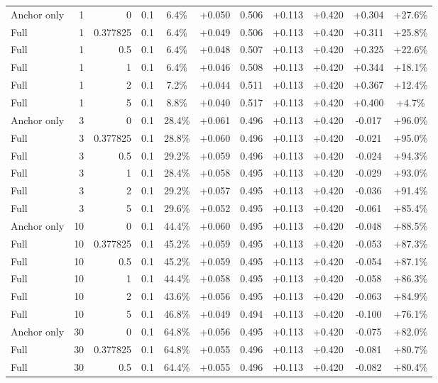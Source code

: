 \begin{table}[htbp]
\begin{tabular}{lrrrccccccc}
Anchor only & 1 & 0 & 0.1 & 6.4\% & +0.050 & 0.506 & +0.113 & +0.420 & +0.304 & +27.6\% \\
Full & 1 & 0.377825 & 0.1 & 6.4\% & +0.049 & 0.506 & +0.113 & +0.420 & +0.311 & +25.8\% \\
Full & 1 & 0.5 & 0.1 & 6.4\% & +0.048 & 0.507 & +0.113 & +0.420 & +0.325 & +22.6\% \\
Full & 1 & 1 & 0.1 & 6.4\% & +0.046 & 0.508 & +0.113 & +0.420 & +0.344 & +18.1\% \\
Full & 1 & 2 & 0.1 & 7.2\% & +0.044 & 0.511 & +0.113 & +0.420 & +0.367 & +12.4\% \\
Full & 1 & 5 & 0.1 & 8.8\% & +0.040 & 0.517 & +0.113 & +0.420 & +0.400 & +4.7\% \\
Anchor only & 3 & 0 & 0.1 & 28.4\% & +0.061 & 0.496 & +0.113 & +0.420 & -0.017 & +96.0\% \\
Full & 3 & 0.377825 & 0.1 & 28.8\% & +0.060 & 0.496 & +0.113 & +0.420 & -0.021 & +95.0\% \\
Full & 3 & 0.5 & 0.1 & 29.2\% & +0.059 & 0.496 & +0.113 & +0.420 & -0.024 & +94.3\% \\
Full & 3 & 1 & 0.1 & 28.4\% & +0.058 & 0.495 & +0.113 & +0.420 & -0.029 & +93.0\% \\
Full & 3 & 2 & 0.1 & 29.2\% & +0.057 & 0.495 & +0.113 & +0.420 & -0.036 & +91.4\% \\
Full & 3 & 5 & 0.1 & 29.6\% & +0.052 & 0.495 & +0.113 & +0.420 & -0.061 & +85.4\% \\
Anchor only & 10 & 0 & 0.1 & 44.4\% & +0.060 & 0.495 & +0.113 & +0.420 & -0.048 & +88.5\% \\
Full & 10 & 0.377825 & 0.1 & 45.2\% & +0.059 & 0.495 & +0.113 & +0.420 & -0.053 & +87.3\% \\
Full & 10 & 0.5 & 0.1 & 45.2\% & +0.059 & 0.495 & +0.113 & +0.420 & -0.054 & +87.1\% \\
Full & 10 & 1 & 0.1 & 44.4\% & +0.058 & 0.495 & +0.113 & +0.420 & -0.058 & +86.3\% \\
Full & 10 & 2 & 0.1 & 43.6\% & +0.056 & 0.495 & +0.113 & +0.420 & -0.063 & +84.9\% \\
Full & 10 & 5 & 0.1 & 46.8\% & +0.049 & 0.494 & +0.113 & +0.420 & -0.100 & +76.1\% \\
Anchor only & 30 & 0 & 0.1 & 64.8\% & +0.056 & 0.495 & +0.113 & +0.420 & -0.075 & +82.0\% \\
Full & 30 & 0.377825 & 0.1 & 64.8\% & +0.055 & 0.496 & +0.113 & +0.420 & -0.081 & +80.7\% \\
Full & 30 & 0.5 & 0.1 & 64.4\% & +0.055 & 0.496 & +0.113 & +0.420 & -0.082 & +80.4\% \\

\end{tabular}
\end{table}
